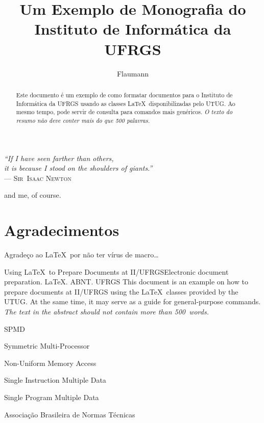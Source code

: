\documentclass[diss,ppgc,openright,english]{iiufrgs}
\title{Um Exemplo de Monografia do Instituto de Informática da UFRGS}
\author{Flaumann}{Fritz Gutenberg}
\begin{document}
\maketitle

\clearpage
\begin{flushright}
\mbox{}\vfill
{\sffamily\itshape
``If I have seen farther than others,\\
it is because I stood on the shoulders of giants.''\\}
--- \textsc{Sir~Isaac Newton}

and me, of course.

\end{flushright}

\chapter*{Agradecimentos}
Agradeço ao \LaTeX\ por não ter vírus de macro\ldots


\begin{abstract}
Este documento é um exemplo de como formatar documentos para o
Instituto de Informática da UFRGS usando as classes \LaTeX\
disponibilizadas pelo UTUG\@. Ao mesmo tempo, pode servir de consulta
para comandos mais genéricos. \emph{O texto do resumo não deve
conter mais do que 500 palavras.}
\end{abstract}

\begin{englishabstract}{Using \LaTeX\ to Prepare Documents at II/UFRGS}{Electronic document preparation. \LaTeX. ABNT. UFRGS}
This document is an example on how to prepare documents at II/UFRGS
using the \LaTeX\ classes provided by the UTUG\@. At the same time, it
may serve as a guide for general-purpose commands. \emph{The text in
the abstract should not contain more than 500~words.}
\end{englishabstract}

\begin{listofabbrv}{SPMD}
        \item[SMP] Symmetric Multi-Processor
        \item[NUMA] Non-Uniform Memory Access
        \item[SIMD] Single Instruction Multiple Data
        \item[SPMD] Single Program Multiple Data
        \item[ABNT] Associação Brasileira de Normas Técnicas
\end{listofabbrv}
\end{document}
